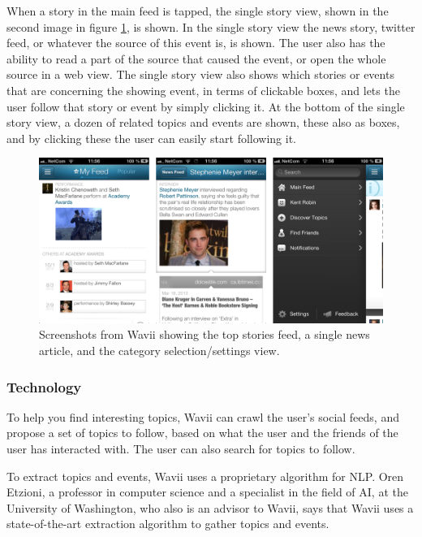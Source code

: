 When a story in the main feed is tapped, the single story view, shown in the second image in figure \ref{screenshots_wavii}, is shown. In the single story view the news story, twitter feed, or whatever the source of this event is, is shown. The user also has the ability to read a part of the source that caused the event, or open the whole source in a web view. The single story view also shows which stories or events that are concerning the showing event, in terms of clickable boxes, and lets the user follow that story or event by simply clicking it. At the bottom of the single story view, a dozen of related topics and events are shown, these also as boxes, and by clicking these the user can easily start following it.

\begin{figure}[!htbp]
\centering
\includegraphics[width=130mm]{GFX/screenshots/wavii.png}
\caption{Screenshots from Wavii showing the top stories feed, a single news article, and the category selection/settings view.}
\label{screenshots_wavii}
\end{figure}

\subsubsection{Technology}
To help you find interesting topics, Wavii can crawl the user's social feeds, and propose a set of topics to follow, based on what the user and the friends of the user has interacted with. The user can also search for topics to follow.

To extract topics and events, Wavii uses a proprietary algorithm for NLP\cite{wavii_proprietary_algorithm}. Oren Etzioni, a professor in computer science and a specialist in the field of AI, at the University of Washington, who also is an advisor to Wavii, says that Wavii uses a state-of-the-art extraction algorithm to gather topics and events\cite{wavii_facebook_for_topics}.

